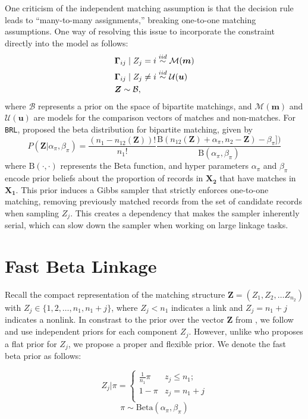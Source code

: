 \documentclass[ba]{imsart}
\begin{document}
One criticism of the independent matching assumption is that the decision rule leads to ``many-to-many assignments,'' breaking one-to-one matching assumptions. One way of resolving this issue to incorporate the constraint directly into the model as follows:
\begin{align}
	&\bm{\Gamma}_{ij} \mid Z_j =i \stackrel{iid}{\sim} \mathcal{M}(\bm{m})  \\
	&\bm{\Gamma}_{ij} \mid Z_j \neq i \stackrel{iid}{\sim} \mathcal{U}(\bm{u}) \notag \\
	& \bm{Z} \sim \mathcal{B}, \notag
\end{align}
where $\mathcal{B}$ represents a prior on the space of bipartite matchings, and $\mathcal{M}(\bm{m})$ and $\mathcal{U}(\bm{u})$ are models for the comparison vectors of matches and non-matches. For \texttt{BRL}, \cite{sadinle_bayesian_2017} proposed the beta distribution for bipartite matching, given by
$$P(\bm{Z}|\alpha_{\pi}, \beta_{\pi}) = \frac{(n_1 - n_{12}(\bm{Z}))!}{n_1 !}\frac{\text{B}(n_{12}(\bm{Z}) + \alpha_{\pi}, n_2 - \bm{Z}) - \beta_{\pi}])}{\text{B}(\alpha_{\pi}, \beta_{\pi})}
$$
where $\text{B}(\cdot, \cdot)$ represents the Beta function, and hyper parameters $\alpha_{\pi}$ and $\beta_{\pi}$ encode prior beliefs about the proportion of records in $\bm{X_2}$ that have matches in $\bm{X_1}$. This prior induces a Gibbs sampler that strictly enforces one-to-one matching, removing previously matched records from the set of candidate records when sampling \(Z_j\). This creates a dependency that makes the sampler inherently serial, which can slow down the sampler when working on large linkage tasks.

\section{Fast Beta Linkage}
\label{sec:fast-beta-linkage}

Recall the compact representation of the matching structure $\bm{Z} = (Z_1, Z_2, \ldots Z_{n_2})$ with $Z_j \in \{1,2, \ldots, n_1, n_1 + j\}$, where $Z_j < n_1$ indicates a link and $Z_j = n_1 + j$ indicates a nonlink. In constrast to the prior over the vector $\bm{Z}$ from \cite{sadinle_bayesian_2017}, we follow \cite{heck2019} and use independent priors for each component $Z_j$. However, unlike \cite{heck2019} who proposes a flat prior for $Z_j$, we propose a proper and flexible prior. We denote the fast beta prior as follows:

$$Z_j | \pi =
\begin{cases} 
	\frac{1}{n_1}\pi  & z_j \leq n_1; \\
	1-\pi &  z_j  = n_1 + j \\
\end{cases}$$
$$\pi \sim \text{Beta}(\alpha_{\pi}, \beta_{\pi})$$
\end{document}

